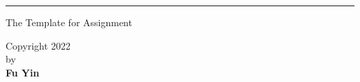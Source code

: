 
\thispagestyle{empty}

\hrule
\begin{center}
    \vspace{3cm}
    {\LARGE The Template for Assignment \par}
    \vspace{3cm}
    Copyright 2022\\
    \vspace{0.3cm}
    by\\
    \vspace{0.3cm}
    \textbf{Fu Yin}
\end{center}